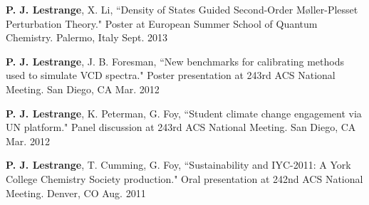\begin{cvpresentations}
\cvpresentation
{\textbf{P. J. Lestrange}, X. Li, ``Density of States Guided Second-Order M{\o}ller-Plesset Perturbation Theory." Poster at European Summer School of Quantum Chemistry.} %
{Palermo, Italy} %
{Sept. 2013} %


\cvpresentation
{\textbf{P. J. Lestrange}, J. B. Foresman, ``New benchmarks for calibrating methods used to simulate VCD spectra." Poster presentation at 243rd ACS National Meeting.} %
{San Diego, CA} %
{Mar. 2012} %


\cvpresentation
{\textbf{P. J. Lestrange}, K. Peterman, G. Foy, ``Student climate change engagement via UN platform." Panel discussion at 243rd ACS National Meeting.} %
{San Diego, CA} %
{Mar. 2012} %


\cvpresentation
{\textbf{P. J. Lestrange}, T. Cumming, G. Foy, ``Sustainability and IYC-2011: A York College Chemistry Society production." Oral presentation at 242nd ACS National Meeting.} %
{Denver, CO} %
{Aug. 2011} %


\end{cvpresentations}
\vspace{-1cm}
